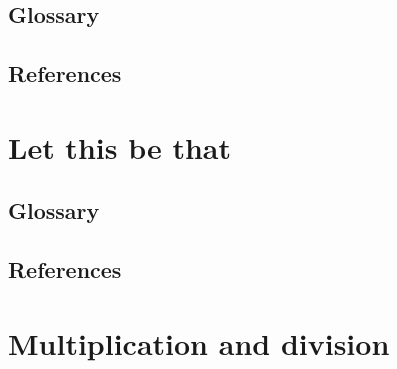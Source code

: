 \documentclass[12pt]{book}
\begin{document}
\section{Glossary}
\section{References}
\newpage

\chapter{Let this be that}%
\section{Glossary}
\section{References}
\newpage

\chapter{Multiplication and division}%


\end{document}

